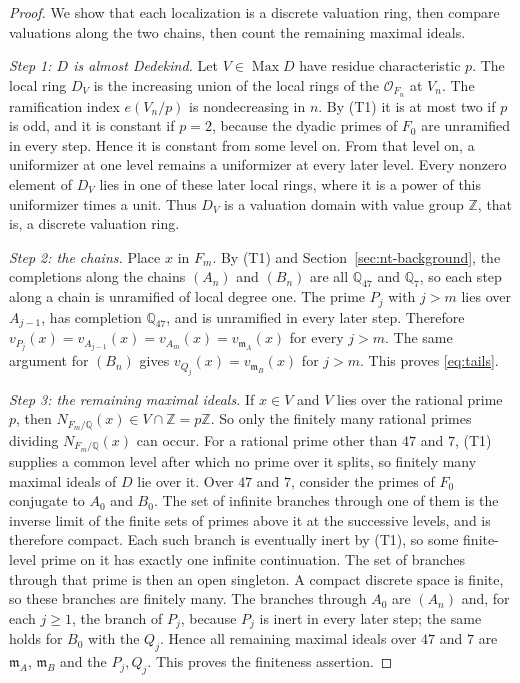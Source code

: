 \documentclass[11pt]{article}
\theoremstyle{plain}
\theoremstyle{definition}
\theoremstyle{remark}
\DeclareMathOperator{\Max}{Max}
\newcommand{\Z}{\mathbb Z}
\newcommand{\Q}{\mathbb Q}
\newcommand{\OO}{\mathcal O}
\newcommand{\EA}{\mathfrak m_A}
\newcommand{\EB}{\mathfrak m_B}
\begin{document}
\begin{proof}
We show that each localization is a discrete valuation ring, then
compare valuations along the two chains, then count the remaining
maximal ideals.

\emph{Step 1: $D$ is almost Dedekind.}  Let $V\in\Max D$ have residue
characteristic $p$.  The local ring $D_V$ is the increasing union of the
local rings of the $\OO_{F_n}$ at $V_n$.  The ramification index
$e(V_n/p)$ is nondecreasing in $n$.  By (T1) it is at most two if $p$
is odd, and it is constant if $p=2$, because the dyadic primes of $F_0$ are
unramified in every step.  Hence it is constant from some level on.  From
that level on, a uniformizer at one level remains a uniformizer at every
later level.  Every nonzero element of $D_V$ lies in one of these later
local rings, where it is a power of this uniformizer times a unit.  Thus
$D_V$ is a valuation domain with value group $\Z$, that is, a discrete
valuation ring.

\emph{Step 2: the chains.}  Place $x$ in $F_m$.  By (T1) and
Section~\ref{sec:nt-background}, the completions along the chains $(A_n)$
and $(B_n)$ are all $\Q_{47}$ and $\Q_7$, so each step along a chain is
unramified of local degree one.  The prime $P_j$ with $j>m$ lies over
$A_{j-1}$, has completion $\Q_{47}$, and is unramified in every later
step.  Therefore $v_{P_j}(x)=v_{A_{j-1}}(x)=v_{A_m}(x)=v_{\EA}(x)$ for every
$j>m$.  The same argument for $(B_n)$ gives $v_{Q_j}(x)=v_{\EB}(x)$ for
$j>m$.  This proves \eqref{eq:tails}.

\emph{Step 3: the remaining maximal ideals.}  If $x\in V$ and $V$ lies over
the rational prime $p$, then $N_{F_m/\Q}(x)\in V\cap\Z=p\Z$.  So only the
finitely many rational primes dividing $N_{F_m/\Q}(x)$ can occur.  For a
rational prime other than $47$ and $7$, (T1) supplies a common level after
which no prime over it splits, so finitely many maximal ideals of $D$ lie
over it.  Over $47$ and $7$, consider the primes of $F_0$ conjugate to
$A_0$ and $B_0$.  The set of infinite branches through one of them is the
inverse limit of the finite sets of primes above it at the successive
levels, and is therefore compact.  Each such branch is eventually inert by
(T1), so some finite-level prime on it has exactly one infinite
continuation.  The set of branches through that prime is then an open
singleton.  A compact discrete space is finite, so these branches are
finitely many.  The branches through $A_0$ are $(A_n)$ and, for each
$j\geq1$, the branch of $P_j$, because $P_j$ is inert in every later step;
the same holds for $B_0$ with the $Q_j$.  Hence all remaining maximal
ideals over $47$ and $7$ are $\EA$, $\EB$ and the $P_j,Q_j$.  This proves
the finiteness assertion.


\end{proof}
\end{document}
